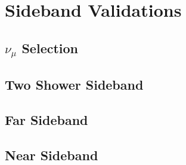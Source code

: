 \section{Sideband Validations}
\label{appendix:SidebandValidations}

\subsection{$\nu_{\mu}$ Selection}
\subsection{Two Shower Sideband}
\subsection{Far Sideband}
\subsection{Near Sideband}